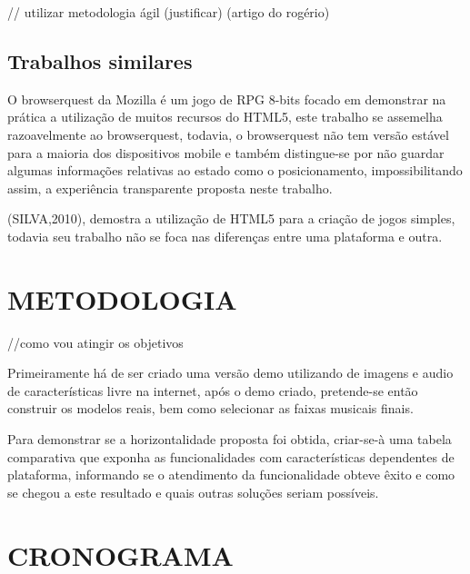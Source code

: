 \documentclass{article}
\begin{document}
// utilizar metodologia ágil (justificar) (artigo do rogério)
\subsection{Trabalhos similares} 

O browserquest da Mozilla é um jogo de RPG 8-bits focado em demonstrar na prática a utilização de muitos recursos do HTML5, este trabalho se assemelha razoavelmente ao browserquest, todavia, o browserquest não tem versão estável para a maioria dos dispositivos mobile e também distingue-se por não guardar algumas informações relativas ao estado como o posicionamento, impossibilitando assim, a experiência transparente proposta neste trabalho.

(SILVA,2010), demostra a utilização de HTML5 para a criação de jogos simples, todavia seu trabalho não se foca nas diferenças entre uma plataforma e outra. 

\section{METODOLOGIA}
//como vou  atingir os objetivos

Primeiramente há de ser criado uma versão demo utilizando de imagens e audio de características livre na internet, após o demo criado, pretende-se então construir os modelos reais, bem como selecionar as faixas musicais finais.

Para demonstrar se a horizontalidade proposta foi obtida, criar-se-à uma tabela comparativa que exponha as funcionalidades com características dependentes de plataforma, informando se o atendimento da funcionalidade obteve êxito e como se chegou a este resultado e quais outras soluções seriam possíveis.


\section{CRONOGRAMA}
\end{document}
